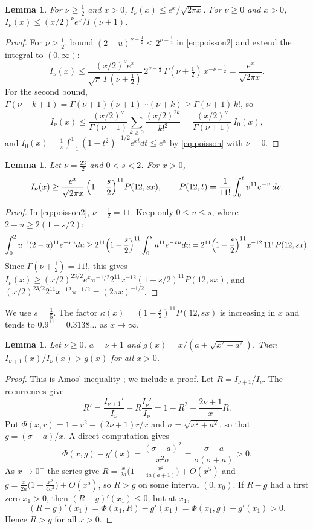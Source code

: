 \documentclass[11pt]{amsart}
\newtheorem{lemma}[theorem]{Lemma}
\theoremstyle{definition}
\begin{document}
\begin{lemma}\label{lem:besselupper}
For $\nu\ge\frac12$ and $x>0$, $I_\nu(x)\le e^x/\sqrt{2\pi x}$. For $\nu\ge0$ and $x>0$, $I_\nu(x)\le(x/2)^\nu e^x/\Gamma(\nu+1)$.
\end{lemma}

\begin{proof}
For $\nu\ge\frac12$, bound $(2-u)^{\nu-\frac12}\le2^{\nu-\frac12}$ in \eqref{eq:poisson2} and extend the integral to $(0,\infty)$:
\[
I_\nu(x)\le\frac{(x/2)^\nu e^x}{\sqrt\pi\,\Gamma(\nu+\frac12)}\,2^{\nu-\frac12}\,\Gamma(\nu+\tfrac12)\,x^{-\nu-\frac12}=\frac{e^x}{\sqrt{2\pi x}}.
\]
For the second bound, $\Gamma(\nu+k+1)=\Gamma(\nu+1)(\nu+1)\cdots(\nu+k)\ge\Gamma(\nu+1)\,k!$, so
\[
I_\nu(x)\le\frac{(x/2)^\nu}{\Gamma(\nu+1)}\sum_{k\ge0}\frac{(x/2)^{2k}}{k!^2}=\frac{(x/2)^\nu}{\Gamma(\nu+1)}\,I_0(x),
\]
and $I_0(x)=\frac1\pi\int_{-1}^1(1-t^2)^{-1/2}e^{xt}dt\le e^x$ by \eqref{eq:poisson} with $\nu=0$.
\end{proof}

\begin{lemma}\label{lem:besselower}
Let $\nu=\frac{23}2$ and $0<s<2$. For $x>0$,
\[
I_\nu(x)\ge\frac{e^x}{\sqrt{2\pi x}}\,\Bigl(1-\frac s2\Bigr)^{11}P(12,sx),\qquad P(12,t)=\frac{1}{11!}\int_0^tv^{11}e^{-v}\,dv .
\]
\end{lemma}

\begin{proof}
In \eqref{eq:poisson2}, $\nu-\frac12=11$. Keep only $0\le u\le s$, where $2-u\ge2(1-s/2)$:
\[
\int_0^2u^{11}(2-u)^{11}e^{-xu}du\ge2^{11}\Bigl(1-\frac s2\Bigr)^{11}\int_0^su^{11}e^{-xu}du=2^{11}\Bigl(1-\frac s2\Bigr)^{11}x^{-12}\,11!\,P(12,sx).
\]
Since $\Gamma(\nu+\frac12)=11!$, this gives $I_\nu(x)\ge(x/2)^{23/2}e^x\pi^{-1/2}2^{11}x^{-12}(1-s/2)^{11}P(12,sx)$, and $(x/2)^{23/2}2^{11}x^{-12}\pi^{-1/2}=(2\pi x)^{-1/2}$.
\end{proof}

We use $s=\frac15$. The factor $\kappa(x)=(1-\frac s2)^{11}P(12,sx)$ is increasing in $x$ and tends to $0.9^{11}=0.3138\ldots$ as $x\to\infty$.

\begin{lemma}\label{lem:ratio}
Let $\nu\ge0$, $a=\nu+1$ and $g(x)=x/(a+\sqrt{x^2+a^2})$. Then $I_{\nu+1}(x)/I_\nu(x)>g(x)$ for all $x>0$.
\end{lemma}

\begin{proof}
This is Amos' inequality \cite{Amo74}; we include a proof. Let $R=I_{\nu+1}/I_\nu$. The recurrences give
\[
R'=\frac{I_{\nu+1}'}{I_\nu}-R\frac{I_\nu'}{I_\nu}=1-R^2-\frac{2\nu+1}{x}R .
\]
Put $\Phi(x,r)=1-r^2-(2\nu+1)r/x$ and $\sigma=\sqrt{x^2+a^2}$, so that $g=(\sigma-a)/x$. A direct computation gives
\[
\Phi(x,g)-g'(x)=\frac{(\sigma-a)^2}{x^2\sigma}=\frac{\sigma-a}{\sigma(\sigma+a)}>0 .
\]
As $x\to0^+$ the series give $R=\frac{x}{2a}\bigl(1-\frac{x^2}{4a(a+1)}\bigr)+O(x^5)$ and $g=\frac x{2a}\bigl(1-\frac{x^2}{4a^2}\bigr)+O(x^5)$, so $R>g$ on some interval $(0,x_0)$. If $R-g$ had a first zero $x_1>0$, then $(R-g)'(x_1)\le0$; but at $x_1$,
\[
(R-g)'(x_1)=\Phi(x_1,R)-g'(x_1)=\Phi(x_1,g)-g'(x_1)>0 .
\]
Hence $R>g$ for all $x>0$.
\end{proof}
\end{document}
